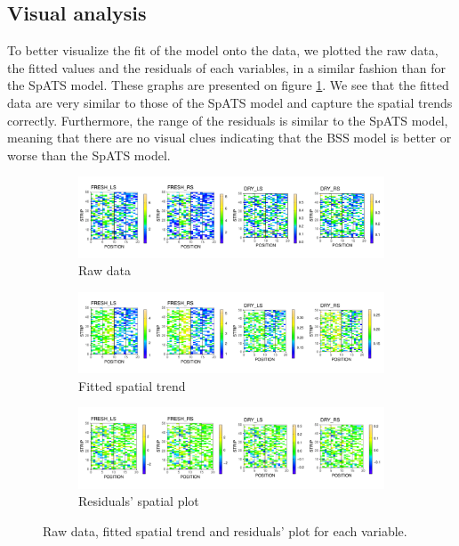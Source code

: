 \subsection{Visual analysis}
To better visualize the fit of the model onto the data, we plotted the raw data, the fitted values and the residuals of each variables, in a similar fashion than for the SpATS model. These graphs are presented on figure \ref{fig:BSS_model_results}. We see that the fitted data are very similar to those of the SpATS model and capture the spatial trends correctly. Furthermore, the range of the residuals is similar to the SpATS model, meaning that there are no visual clues indicating that the BSS model is better or worse than the SpATS model.

\begin{figure}
	\begin{subfigure}[t]{\textwidth}
		\centering
		\includegraphics[width = \textwidth]{../../Figures/BSS_rawData_plot.pdf}
		\caption{Raw data}
	\end{subfigure}
	
	\begin{subfigure}[t]{\textwidth}
		\centering
		\includegraphics[width = \textwidth]{../../Figures/BSS_FittedData_plot.pdf}
		\caption{Fitted spatial trend}
	\end{subfigure}
	
	\begin{subfigure}[t]{\textwidth}
		\centering
		\includegraphics[width = \textwidth]{../../Figures/BSS_residuals_plot.pdf}
		\caption{Residuals' spatial plot}
	\end{subfigure}
	\caption{Raw data, fitted spatial trend and residuals' plot for each variable.}
	\label{fig:BSS_model_results}
\end{figure}


